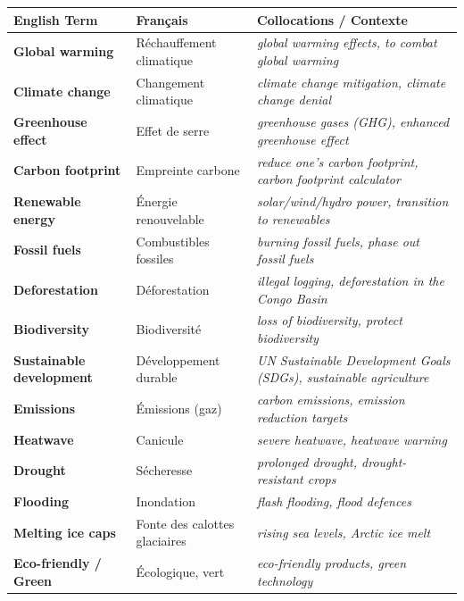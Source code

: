 \documentclass[11pt]{article}
\newcommand{\eng}[1]{\ifmmode\text{\textit{#1}}\else\begingroup\selectlanguage{english}\itshape #1\endgroup\fi}
\begin{document}
\begin{center}
\begin{tabularx}{\linewidth}{|>{\bfseries}X|X|X|}
\hline
\rowcolor{popblueL} \textbf{English Term} & \textbf{Français} & \textbf{Collocations / Contexte} \\
\hline
Global warming & Réchauffement climatique & \eng{global warming effects}, \eng{to combat global warming} \\
\hline
Climate change & Changement climatique & \eng{climate change mitigation}, \eng{climate change denial} \\
\hline
Greenhouse effect & Effet de serre & \eng{greenhouse gases (GHG)}, \eng{enhanced greenhouse effect} \\
\hline
Carbon footprint & Empreinte carbone & \eng{reduce one's carbon footprint}, \eng{carbon footprint calculator} \\
\hline
Renewable energy & Énergie renouvelable & \eng{solar/wind/hydro power}, \eng{transition to renewables} \\
\hline
Fossil fuels & Combustibles fossiles & \eng{burning fossil fuels}, \eng{phase out fossil fuels} \\
\hline
Deforestation & Déforestation & \eng{illegal logging}, \eng{deforestation in the Congo Basin} \\
\hline
Biodiversity & Biodiversité & \eng{loss of biodiversity}, \eng{protect biodiversity} \\
\hline
Sustainable development & Développement durable & \eng{UN Sustainable Development Goals (SDGs)}, \eng{sustainable agriculture} \\
\hline
Emissions & Émissions (gaz) & \eng{carbon emissions}, \eng{emission reduction targets} \\
\hline
Heatwave & Canicule & \eng{severe heatwave}, \eng{heatwave warning} \\
\hline
Drought & Sécheresse & \eng{prolonged drought}, \eng{drought-resistant crops} \\
\hline
Flooding & Inondation & \eng{flash flooding}, \eng{flood defences} \\
\hline
Melting ice caps & Fonte des calottes glaciaires & \eng{rising sea levels}, \eng{Arctic ice melt} \\
\hline
Eco-friendly / Green & Écologique, vert & \eng{eco-friendly products}, \eng{green technology} \\
\hline
\end{tabularx}
\end{center}
\end{document}
